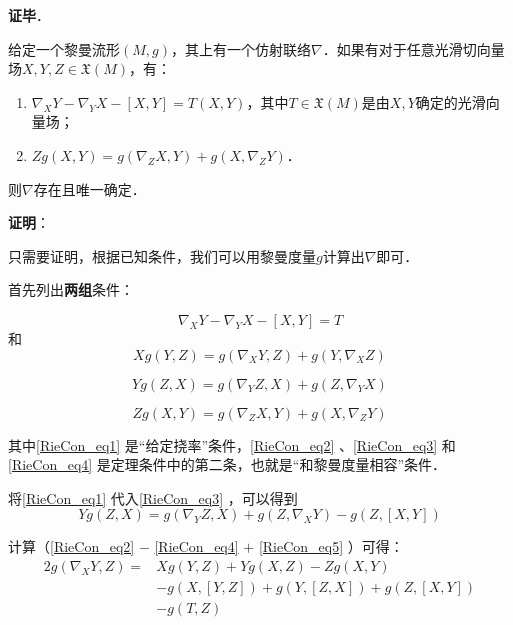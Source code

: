 \textbf{证毕}．






\begin{theorem}{}\label{RieCon_the1}
给定一个黎曼流形$(M, g)$，其上有一个仿射联络$\nabla$．如果有对于任意光滑切向量场$X, Y, Z\in\mathfrak{X}(M)$，有：
\begin{enumerate}
\item $\nabla_XY-\nabla_YX-[X, Y]=T(X, Y)$，其中$T\in \mathfrak{X}(M)$是由$X, Y$确定的光滑向量场；
\item $Zg(X, Y)=g(\nabla_ZX, Y)+g(X, \nabla_ZY)$．
\end{enumerate}
则$\nabla$存在且唯一确定．
\end{theorem}

\textbf{证明}：

只需要证明，根据已知条件，我们可以用黎曼度量$g$计算出$\nabla$即可．

首先列出\textbf{两组}条件：

\begin{equation}\label{RieCon_eq1}
\nabla_XY-\nabla_YX-[X, Y]=T
\end{equation}
和
\begin{equation}\label{RieCon_eq2}
Xg(Y, Z)=g(\nabla_XY, Z)+g(Y, \nabla_XZ)
\end{equation}

\begin{equation}\label{RieCon_eq3}
Yg(Z, X)=g(\nabla_YZ, X)+g(Z, \nabla_YX)
\end{equation}

\begin{equation}\label{RieCon_eq4}
Zg(X, Y)=g(\nabla_ZX, Y)+g(X, \nabla_ZY)
\end{equation}


其中\autoref{RieCon_eq1} 是“给定挠率”条件，\autoref{RieCon_eq2} 、\autoref{RieCon_eq3} 和\autoref{RieCon_eq4} 是定理条件中的第二条，也就是“和黎曼度量相容”条件．

将\autoref{RieCon_eq1} 代入\autoref{RieCon_eq3} ，可以得到
\begin{equation}\label{RieCon_eq5}
Yg(Z, X)=g(\nabla_YZ, X)+g(Z, \nabla_XY)-g(Z, [X, Y])
\end{equation}

计算（\autoref{RieCon_eq2} $-$ \autoref{RieCon_eq4} $+$ \autoref{RieCon_eq5} ）可得：
\begin{equation}\label{RieCon_eq6}
\begin{aligned}
2g(\nabla_XY, Z)=&Xg(Y, Z)+Yg(X, Z)-Zg(X, Y)\\&-g(X, [Y, Z])+g(Y, [Z, X])+g(Z, [X, Y])\\&-g(T, Z)
\end{aligned}
\end{equation}

